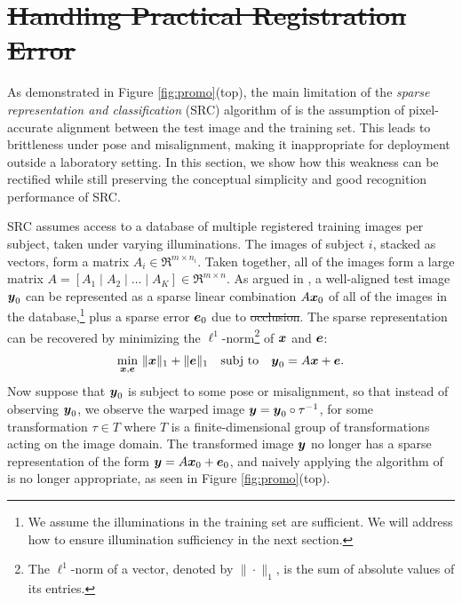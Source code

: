 \documentclass[12pt,journal,draftcls,letterpaper,onecolumn]{IEEEtran}
\newcommand{\subj}{\textup{subj to}}
\providecommand{\DIFadd}[1]{{\protect\color{blue}\uwave{#1}}} %
\providecommand{\DIFdel}[1]{{\protect\color{red}\sout{#1}}}                      %
\providecommand{\DIFaddbegin}{} %
\providecommand{\DIFaddend}{} %
\providecommand{\DIFdelbegin}{} %
\providecommand{\DIFdelend}{} %
\begin{document}
\section{\DIFdelbegin \DIFdel{Handling Practical Registration Error}\DIFdelend \DIFaddbegin \DIFadd{Robust Alignment}\DIFaddend }\label{sec:registration}
As demonstrated in Figure \ref{fig:promo}(top), the main
limitation of the {\em sparse representation and
classification} (SRC) algorithm of \cite{Wright2009-PAMI} is
the assumption of pixel-accurate alignment between the test
image and the training set. This leads to brittleness under
pose and misalignment, making it inappropriate for deployment
outside a laboratory setting. In this section, we show how this
weakness can be rectified while still preserving the conceptual
simplicity and good recognition performance of SRC.

SRC assumes access to a database of multiple registered
training images per subject, taken under varying illuminations.
The images of subject $i$, stacked as vectors, form a matrix
$A_i \in \Re^{m \times n_i}$. Taken together, all of the images
form a large matrix $A = [ A_1 \mid A_2 \mid \dots \mid A_K ]
\in \Re^{m \times n}$. As argued in \cite{Wright2009-PAMI}, a
well-aligned test image ${\boldsymbol{y}}_0$ can be represented as a sparse
linear combination $A {\boldsymbol{x}}_0$ of all of the images in the
database,\footnote{We assume the illuminations in the training
set are sufficient. We will address how to ensure illumination
sufficiency in the next section.} plus a sparse error $\boldsymbol{e}_0$
due to \DIFdelbegin \DIFdel{occlusion}\DIFdelend \DIFaddbegin \DIFadd{corrupted pixels}\DIFaddend . The sparse representation can be recovered by
minimizing the $\ell^1$-norm\footnote{The $\ell^1$-norm of a
vector, denoted by $\|\cdot\|_1$, is the sum of absolute values of its entries.} of
${\boldsymbol{x}}$ and $\boldsymbol{e}$:
\begin{equation}
\min_{\x,\e} \, \| \x \|_1 + \| \e\|_1 \quad \subj \quad \y_0 = A \x + \e.
\label{eqn:robust-l1}
\end{equation}
Now suppose that ${\boldsymbol{y}}_0$ is subject to some pose or
misalignment, so that instead of observing ${\boldsymbol{y}}_0$, we observe
the warped image ${\boldsymbol{y}} = {\boldsymbol{y}}_0 \circ \tau^{-1}$, for some
transformation $\tau \in T$ where $T$ is a finite-dimensional
group of transformations acting on the image domain.  The
transformed image ${\boldsymbol{y}}$ no longer has a sparse representation of
the form ${\boldsymbol{y}} = A {\boldsymbol{x}}_0 + \boldsymbol{e}_0$, and naively applying the
algorithm of \cite{Wright2009-PAMI} is no longer appropriate,
as seen in Figure \ref{fig:promo}(top).
\end{document}

